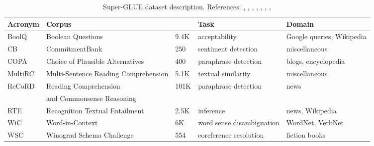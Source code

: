 \documentclass{article} \usepackage{iclr2021_conference,times}
\begin{document}
\begin{table}[ht]
\caption{\small Super-GLUE \citep{superglue} dataset description. References: \citet{boolq}, \citet{cb}, \citet{copa},  \citet{multirc}, \citet{record}, \citet{superglue}, \citet{wic}, \citet{wnli} }
\begin{adjustbox}{width=\columnwidth,center}
\begin{tabular}{|l|l|l|l|l|}
	\hline 
		\textbf{Acronym} & \textbf{Corpus} &  & \textbf{Task} & \textbf{Domain}  \\
		\hline
		BoolQ   & Boolean Questions  & 9.4K & acceptability & Google queries, Wikipedia \\
		CB      & CommitmentBank & 250 & sentiment detection & miscellaneous \\
		COPA    & Choice of Plausible Alternatives & 400 & paraphrase detection & blogs, encyclopedia \\
		MultiRC & Multi-Sentence Reading Comprehension & 5.1K & textual similarity & miscellaneous \\
		ReCoRD  & Reading Comprehension & 101K & paraphrase detection & news \\
		            & and Commonsense Reasoning & & & \\
		RTE     & Recognition Textual Entailment & 2.5K & inference & news, Wikipedia \\
		WiC     & Word-in-Context & 6K & word sense disambiguation & WordNet, VerbNet \\
		WSC     & Winograd Schema Challenge & 554 & coreference resolution & fiction books \\

    \hline
\end{tabular}
\end{adjustbox}
\end{table}
\end{document}
